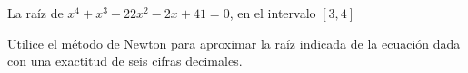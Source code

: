 \item La raíz de $x^4 + x^3 - 22x^2 - 2x + 41 = 0$, en el intervalo $[3, 4]$
\par
Utilice el método de Newton para aproximar la raíz indicada de la ecuación dada con una exactitud de seis cifras decimales.
